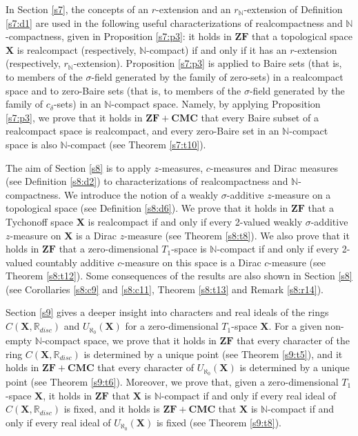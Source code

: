 \documentclass[12pt,twoside,leqno]{article}
\theoremstyle{plain}
\theoremstyle{definition}
\theoremstyle{remark}
\begin{document}
In Section \ref{s7}, the concepts of an $r$-extension and an $r_{\mathbb{N}}$-extension of Definition \ref{s7:d1} are used in the following useful characterizations of realcompactness and $\mathbb{N}$-compactness, given in Proposition \ref{s7:p3}: it holds in $\mathbf{ZF}$ that a topological space $\mathbf{X}$ is realcompact (respectively, $\mathbb{N}$-compact) if and only if it has an $r$-extension (respectively, $r_{\mathbb{N}}$-extension). Proposition \ref{s7:p3} is applied to Baire sets (that is, to members of the $\sigma$-field generated by the family of zero-sets) in a realcompact space and to zero-Baire sets  (that is, to members of the $\sigma$-field generated by the family of $c_{\delta}$-sets) in an $\mathbb{N}$-compact space. Namely, by applying Proposition \ref{s7:p3}, we prove that it holds in $\mathbf{ZF+CMC}$ that every Baire subset of a realcompact space is realcompact, and every zero-Baire set in an  $\mathbb{N}$-compact space is also $\mathbb{N}$-compact (see Theorem \ref{s7:t10}).

The aim of Section \ref{s8} is to apply $z$-measures, $c$-measures and Dirac measures (see Definition \ref{s8:d2}) to characterizations of realcompactness and $\mathbb{N}$-compactness. We introduce the notion of a weakly $\sigma$-additive $z$-measure on a topological space (see Definition \ref{s8:d6}). We prove that it holds in $\mathbf{ZF}$ that a Tychonoff space $\mathbf{X}$ is realcompact if and only if every 2-valued weakly $\sigma$-additive $z$-measure on $\mathbf{X}$ is a Dirac $z$-measure (see Theorem \ref{s8:t8}). We also prove that it holds in $\mathbf{ZF}$ that a zero-dimensional $T_1$-space is $\mathbb{N}$-compact if and only if every 2-valued countably additive $c$-measure on this space is a Dirac $c$-measure (see Theorem \ref{s8:t12}). Some consequences of the results are also shown in Section \ref{s8} (see Corollaries \ref{s8:c9} and \ref{s8:c11}, Theorem \ref{s8:t13} and Remark \ref{s8:r14}).

Section \ref{s9} gives a deeper insight into characters and real ideals of the rings $C(\mathbf{X}, \mathbb{R}_{disc})$ and $U_{\aleph_0}(\mathbf{X})$ for a zero-dimensional $T_1$-space $\mathbf{X}$. For a given non-empty $\mathbb{N}$-compact space, we prove that it holds in $\mathbf{ZF}$ that every character of the ring $C(\mathbf{X}, \mathbb{R}_{disc})$ is determined by a unique point (see Theorem \ref{s9:t5}), and it holds in $\mathbf{ZF+CMC}$ that every character of $U_{\aleph_0}(\mathbf{X})$ is determined by a unique point (see Theorem \ref{s9:t6}). Moreover, we prove that, given a zero-dimensional $T_1$-space $\mathbf{X}$, it holds in $\mathbf{ZF}$ that $\mathbf{X}$ is $\mathbb{N}$-compact if and only if every real ideal of $C(\mathbf{X}, \mathbb{R}_{disc})$ is fixed, and it holds is $\mathbf{ZF+CMC}$ that $\mathbf{X}$ is $\mathbb{N}$-compact if and only if every real ideal of $U_{\aleph_0}(\mathbf{X})$ is fixed (see Theorem \ref{s9:t8}).
\end{document}
